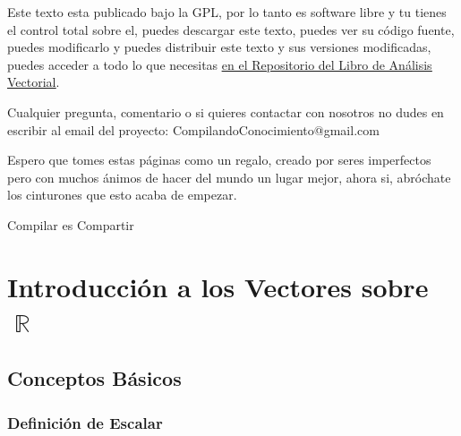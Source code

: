 \documentclass[12pt, fleqn]{report}                             %
\theoremstyle{break}                                            %
\DeclareMathOperator \Reals        {\mathbb{R}}                 %
\begin{document}
    Este texto esta publicado bajo la GPL, por lo tanto es software libre y tu tienes el control total sobre
    el, puedes descargar este texto, puedes ver su código fuente, puedes modificarlo y puedes distribuir este
    texto y sus versiones modificadas, puedes acceder a todo lo que necesitas 
    \href{http://www.github.com/CompilandoConocimiento/LibroAnalisisVectorial}
    {\underline{en el Repositorio del Libro de Análisis Vectorial}}. 

    Cualquier pregunta, comentario o si quieres contactar con nosotros no dudes en escribir al email del proyecto:
    CompilandoConocimiento@gmail.com

    Espero que tomes estas páginas como un regalo, creado por seres imperfectos pero con muchos ánimos de hacer
    del mundo un lugar mejor, ahora si, abróchate los cinturones que esto acaba de empezar.

    \begin{flushright}
        Compilar es Compartir
    \end{flushright}




\part{Introducción a los Vectores sobre $\Reals$}



    \chapter{Conceptos Básicos}
    

        \clearpage
        \section{Definición de Escalar}
\end{document}
